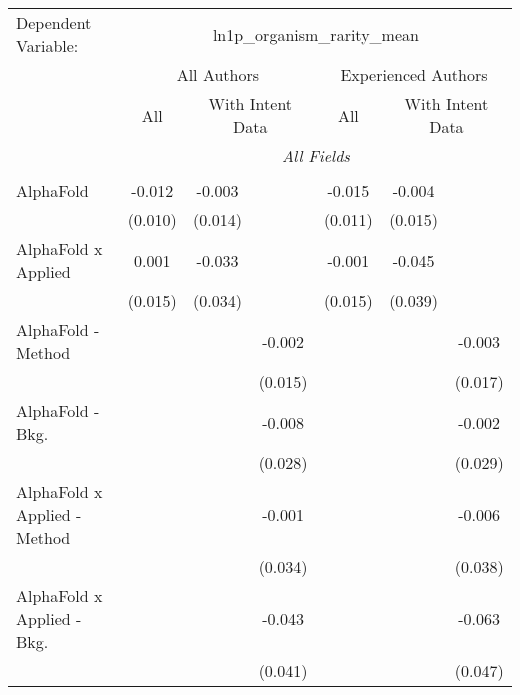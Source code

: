 \begingroup
\centering
\begin{tabular}{lcccccc}
   \tabularnewline \midrule \midrule
   Dependent Variable: & \multicolumn{6}{c}{ln1p\_organism\_rarity\_mean}\\
 & \multicolumn{3}{c}{All Authors} & \multicolumn{3}{c}{Experienced Authors} \\
\cmidrule(lr){2-4} \cmidrule(lr){5-7}
 & \multicolumn{1}{c}{All} & \multicolumn{2}{c}{With Intent Data} & \multicolumn{1}{c}{All} & \multicolumn{2}{c}{With Intent Data} \\
\cmidrule(lr){2-2} \cmidrule(lr){3-4} \cmidrule(lr){5-5} \cmidrule(lr){6-7}
 & \multicolumn{6}{c}{\textit{All Fields}} \\ \\
   AlphaFold                      & -0.012       & -0.003       &               & -0.015      & -0.004       &   \\   
                                  & (0.010)      & (0.014)      &               & (0.011)     & (0.015)      &   \\   
   AlphaFold x Applied            & 0.001        & -0.033       &               & -0.001      & -0.045       &   \\   
                                  & (0.015)      & (0.034)      &               & (0.015)     & (0.039)      &   \\   
   AlphaFold - Method             &              &              & -0.002        &             &              & -0.003\\   
                                  &              &              & (0.015)       &             &              & (0.017)\\   
   AlphaFold - Bkg.               &              &              & -0.008        &             &              & -0.002\\   
                                  &              &              & (0.028)       &             &              & (0.029)\\   
   AlphaFold x Applied - Method   &              &              & -0.001        &             &              & -0.006\\   
                                  &              &              & (0.034)       &             &              & (0.038)\\   
   AlphaFold x Applied - Bkg.     &              &              & -0.043        &             &              & -0.063\\   
                                  &              &              & (0.041)       &             &              & (0.047)\\   

\end{tabular}
